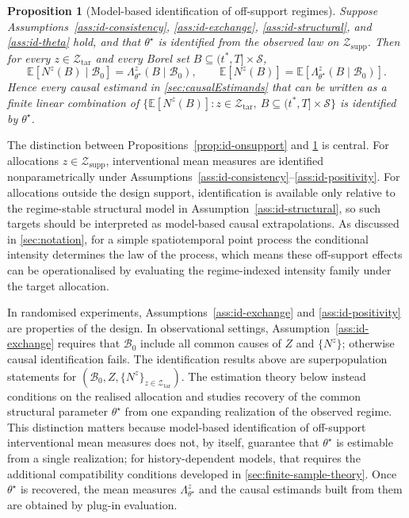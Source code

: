 \documentclass{statsoc}
\newtheorem{proposition}[proposition]{Proposition}
\newcommand{\bbE}{\mathbb{E}}
\newcommand{\1}{\mathbbm{1}}
\newcommand{\Nproc}{N}
\begin{document}
\begin{proposition}[Model-based identification of off-support regimes]\label{prop:id-offsupport}
Suppose Assumptions~\ref{ass:id-consistency}, \ref{ass:id-exchange}, \ref{ass:id-structural}, and \ref{ass:id-theta} hold, and that \(\theta^\star\) is identified from the observed law on \(\mathcal Z_{\mathrm{supp}}\). Then for every \(z\in\mathcal Z_{\mathrm{tar}}\) and every Borel set \(B\subseteq (t^\ast,T]\times\mathcal S\),
\[
\bbE\!\left[\Nproc^z(B)\mid \mathcal B_0\right]
=
\Lambda_{\theta^\star}^z(B\mid \mathcal B_0),
\qquad
\bbE\!\left[\Nproc^z(B)\right]
=
\bbE\!\left[\Lambda_{\theta^\star}^z(B\mid \mathcal B_0)\right].
\]
Hence every causal estimand in \cref{sec:causalEstimands} that can be written as a finite linear combination of \(\{\bbE[\Nproc^z(B)]: z\in\mathcal Z_{\mathrm{tar}},\ B\subseteq (t^\ast,T]\times\mathcal S\}\) is identified by \(\theta^\star\).
\end{proposition}

The distinction between Propositions~\ref{prop:id-onsupport} and \ref{prop:id-offsupport} is central. For allocations \(z\in\mathcal Z_{\mathrm{supp}}\), interventional mean measures are identified nonparametrically under Assumptions~\ref{ass:id-consistency}--\ref{ass:id-positivity}. For allocations outside the design support, identification is available only relative to the regime-stable structural model in Assumption~\ref{ass:id-structural}, so such targets should be interpreted as model-based causal extrapolations. As discussed in \cref{sec:notation}, for a simple spatiotemporal point process the conditional intensity determines the law of the process, which means these off-support effects can be operationalised by evaluating the regime-indexed intensity family under the target allocation.

In randomised experiments, Assumptions~\ref{ass:id-exchange} and \ref{ass:id-positivity} are properties of the design. In observational settings, Assumption~\ref{ass:id-exchange} requires that \(\mathcal B_0\) include all common causes of \(Z\) and \(\{\Nproc^z\}\); otherwise causal identification fails. The identification results above are superpopulation statements for \((\mathcal B_0,Z,\{\Nproc^z\}_{z\in\mathcal Z_{\mathrm{tar}}})\). 
The estimation theory below instead conditions on the realised allocation and studies recovery of the common structural parameter \(\theta^\star\) from one expanding realization of the observed regime.  This distinction matters because model-based identification of off-support interventional mean measures does not, by itself, guarantee that \(\theta^\star\) is estimable from a single realization; for history-dependent models, that requires the additional compatibility conditions developed in \cref{sec:finite-sample-theory}.  Once \(\theta^\star\) is recovered, the mean measures \(\Lambda_{\theta^\star}^z\) and the causal estimands built from them are obtained by plug-in evaluation.
\end{document}
